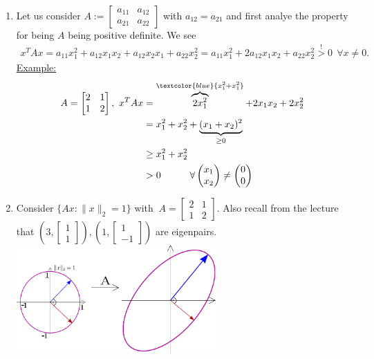 {
\color{solution}
\begin{enumerate}
	\item  Let us consider $A:= \begin{bmatrix}a_{11}&a_{12}\\a_{21}&a_{22}\end{bmatrix} $ with $a_{12} = a_{21}$ and first analye the property for being $A$ being positive definite. We see
	\begin{align*}
		x^TAx=a_{11}x_1^2+a_{12}x_1x_2+a_{12}x_2x_1+a_{22}x_2^2
		=a_{11}x_1^2+2a_{12}x_1x_2+a_{22}x_2^2
		\stackrel{!}{>} 0\ \ \forall x\neq 0.
		\end{align*}
	\underline{Example:}
	\begin{align*}
		A=\begin{bmatrix}2&1\\1&2\end{bmatrix},~ x^TAx &=\overbrace{2x_1^2}^{\textcolor{blue}{x_1^2+x_1^2}}+2x_1x_2+2x_2^2\\
		&=x_1^2+x_2^2+\underbrace{(x_1+x_2)^2}_{\geq0}\\
		&\geq x_1^2+x_2^2\\
		&>0~~~~~~~~~ \forall\begin{pmatrix}x_1\\x_2\end{pmatrix}\neq\begin{pmatrix}0\\0\end{pmatrix}
		\end{align*}
	\item  Consider
	$\{Ax:\|{x}\|_2 =1\}$ with $\ A=\begin{bmatrix}2&1\\1&2\end{bmatrix}$. Also recall from the lecture that $\left(3, \begin{bmatrix}1\\1\end{bmatrix}\right), \left(1, \begin{bmatrix}1\\-1\end{bmatrix}\right)$ are eigenpairs.~\\
	\includegraphics[width=0.6\textwidth]{spdMatrix.pdf}
\end{enumerate}
}